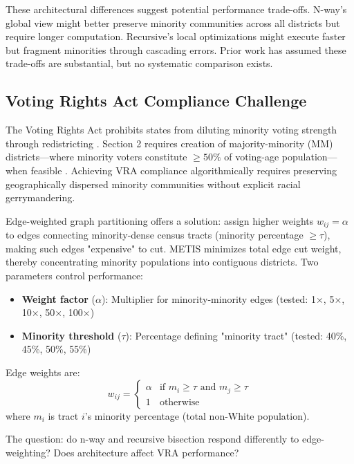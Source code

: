 These architectural differences suggest potential performance trade-offs. N-way's global view might better preserve minority communities across all districts but require longer computation. Recursive's local optimizations might execute faster but fragment minorities through cascading errors. Prior work has assumed these trade-offs are substantial, but no systematic comparison exists.

\subsection{Voting Rights Act Compliance Challenge}

The Voting Rights Act prohibits states from diluting minority voting strength through redistricting \citep{thornburg1986}. Section 2 requires creation of majority-minority (MM) districts—where minority voters constitute $\geq 50\%$ of voting-age population—when feasible \citep{johnson2001}. Achieving VRA compliance algorithmically requires preserving geographically dispersed minority communities without explicit racial gerrymandering.

Edge-weighted graph partitioning offers a solution: assign higher weights $w_{ij} = \alpha$ to edges connecting minority-dense census tracts (minority percentage $\geq \tau$), making such edges "expensive" to cut. METIS minimizes total edge cut weight, thereby concentrating minority populations into contiguous districts. Two parameters control performance:

\begin{itemize}
\item \textbf{Weight factor} ($\alpha$): Multiplier for minority-minority edges (tested: 1$\times$, 5$\times$, 10$\times$, 50$\times$, 100$\times$)
\item \textbf{Minority threshold} ($\tau$): Percentage defining "minority tract" (tested: 40\%, 45\%, 50\%, 55\%)
\end{itemize}

Edge weights are:
\begin{equation}
w_{ij} = \begin{cases}
\alpha & \text{if } m_i \geq \tau \text{ and } m_j \geq \tau \\
1 & \text{otherwise}
\end{cases}
\end{equation}
where $m_i$ is tract $i$'s minority percentage (total non-White population).

The question: do n-way and recursive bisection respond differently to edge-weighting? Does architecture affect VRA performance?

